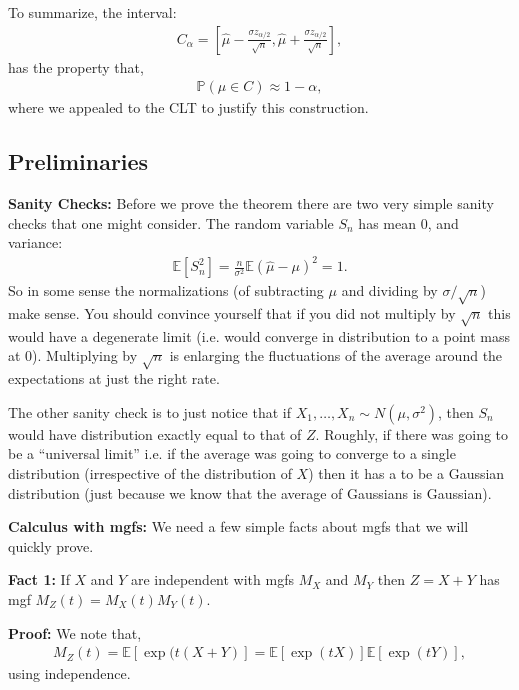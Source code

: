 \documentclass[twoside,12pt]{article}
\begin{document}
To summarize, the interval:
\begin{align*}
C_{\alpha} = \left[\widehat{\mu} - \frac{\sigma z_{\alpha/2} }{ \sqrt{n}}, \widehat{\mu} + \frac{\sigma z_{\alpha/2}}{ \sqrt{n}}\right],
\end{align*}
has the property that,
\begin{align*}
\mathbb{P}(\mu \in C) \approx 1 - \alpha,
\end{align*}
where we appealed to the CLT to justify this construction.

\subsection{Preliminaries}

{\bf Sanity Checks: } Before we prove the theorem there are two very simple sanity checks that one might consider. The random variable $S_n$ has mean 0, and variance:
\begin{align*}
\mathbb{E}[S_n^2] = \frac{n}{\sigma^2} \mathbb{E}(\widehat{\mu} - \mu)^2 = 1.
\end{align*}
So in some sense the normalizations (of subtracting $\mu$ and dividing by $\sigma/\sqrt{n}$) make sense. You should convince yourself that if you did not multiply by $\sqrt{n}$ this would have a degenerate limit (i.e. would converge in distribution to a point mass at $0$). Multiplying by $\sqrt{n}$ is enlarging the fluctuations of the average around the expectations at just the right rate.

The other sanity check is to just notice that if $X_1,\ldots,X_n \sim N(\mu,\sigma^2)$, then $S_n$ would have distribution exactly equal to that of $Z$. Roughly, if there was going to be a ``universal limit'' i.e. if the average was going to converge to a single distribution (irrespective of the distribution of $X$) then it has a to be a Gaussian distribution (just because we know that the average of Gaussians is Gaussian).


{\bf Calculus with mgfs: } We need a few simple facts about mgfs that we will quickly prove.

{\bf Fact 1: } If $X$ and $Y$ are independent with mgfs $M_X$ and $M_Y$ then $Z = X+Y$ has mgf $M_Z(t) = M_X(t)M_Y(t)$.

{\bf Proof: } We note that,
\begin{align*}
M_Z(t) = \mathbb{E}[\exp(t (X + Y)] = \mathbb{E}[\exp(tX)] \mathbb{E}[\exp(tY)],
\end{align*}
using independence.
\end{document}
